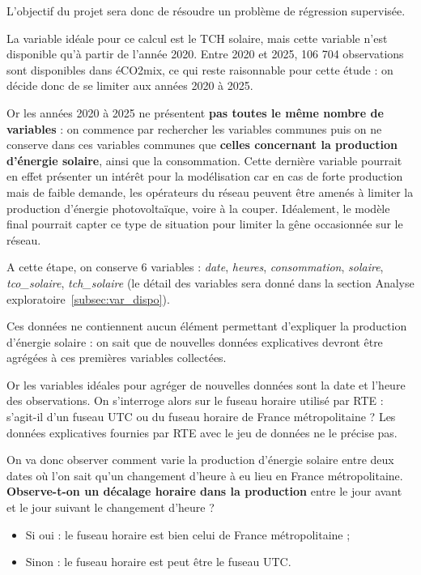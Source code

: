 L'objectif du projet sera donc de résoudre un problème de régression supervisée.

La variable idéale pour ce calcul est le TCH solaire, mais cette variable n’est disponible qu’à partir de l’année 2020. Entre 2020 et 2025, 106 704 observations sont disponibles dans éCO2mix, ce qui reste raisonnable pour cette étude : on décide donc de se limiter aux années 2020 à 2025.

Or les années 2020 à 2025 ne présentent {\bfseries pas toutes le même nombre de variables} : on commence par rechercher les variables communes puis on ne conserve dans ces variables communes que {\bfseries celles concernant la production d’énergie solaire}, ainsi que la consommation. Cette dernière variable pourrait en effet présenter un intérêt pour la modélisation car en cas de forte production mais de faible demande, les opérateurs du réseau peuvent être amenés à limiter la production d’énergie photovoltaïque, voire à la couper. Idéalement, le modèle final pourrait capter ce type de situation pour limiter la gêne occasionnée sur le réseau.

A cette étape, on conserve 6 variables : \textit{date}, \textit{heures}, \textit{consommation}, \textit{solaire}, \textit{tco\_solaire}, \textit{tch\_solaire} (le détail des variables sera donné dans la section Analyse exploratoire~\ref{subsec:var_dispo}).

Ces données ne contiennent aucun élément permettant d’expliquer la production d’énergie solaire : on sait que de nouvelles données explicatives devront être agrégées à ces premières variables collectées.

Or les variables idéales pour agréger de nouvelles données sont la date et l’heure des observations. On s’interroge alors sur le fuseau horaire utilisé par RTE : s’agit-il d’un fuseau UTC ou du fuseau horaire de France métropolitaine ? Les données explicatives fournies par RTE avec le jeu de données ne le précise pas.

On va donc observer comment varie la production d’énergie solaire entre deux dates où l’on sait qu’un changement d’heure à eu lieu en France métropolitaine. \textbf{Observe-t-on un décalage horaire dans la production} entre le jour avant et le jour suivant le changement d'heure ?

\begin{itemize}
\item Si oui : le fuseau horaire est bien celui de France métropolitaine ;
\item Sinon : le fuseau horaire est peut être le fuseau UTC.
\end{itemize}

